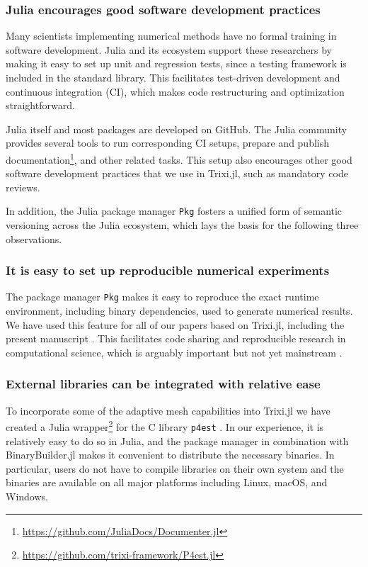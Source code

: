 \documentclass[hidelinks]{juliacon} %
\newcommand{\trixi}{Trixi.jl\xspace}
\begin{document}
\subsubsection{Julia encourages good software development practices}

Many scientists implementing numerical methods have no formal training
in software development. Julia and its ecosystem support these
researchers by making it easy to set up unit and regression tests, since a
testing framework is included in the standard library. This facilitates test-driven
development and continuous integration (CI), which makes code restructuring
and optimization straightforward.

Julia itself and most packages are developed on GitHub. The Julia community provides
several tools to run corresponding CI setups, prepare and publish
documentation\footnote{\url{https://github.com/JuliaDocs/Documenter.jl}},
and other related tasks. This setup also encourages other good software development
practices that we use in \trixi, such as mandatory code reviews.

In addition, the Julia package manager \lstinline{Pkg} fosters a unified form of semantic versioning
across the Julia ecosystem, which lays the basis for the following three
observations.

\subsubsection{It is easy to set up reproducible numerical experiments}

The package manager \lstinline{Pkg} makes it easy to reproduce the exact runtime environment, including
binary dependencies, used to generate numerical results. We have used this feature for all of our papers based on
\trixi \cite{schlottkelakemper2021purely, ranocha2021preventing}, including the present manuscript
\cite{ranocha2021adaptiveRepro}.
This facilitates code sharing and reproducible research in computational science,
which is arguably important but not yet mainstream \cite{barnes2010publish,
donoho2010invitation, leveque2013top}.

\subsubsection{External libraries can be integrated with relative ease}
\label{sec:external-libraries}

To incorporate some of the adaptive mesh capabilities into \trixi
we have created a Julia wrapper\footnote{\url{https://github.com/trixi-framework/P4est.jl}}
for the C library \texttt{p4est} \cite{burstedde2011p4est}. In our experience,
it is relatively easy to do so in Julia, and the package manager in combination
with BinaryBuilder.jl makes it convenient to distribute the necessary binaries.
In particular, users do not have to compile libraries on their own system
and the binaries are available on all major platforms including Linux, macOS,
and Windows.
\end{document}
